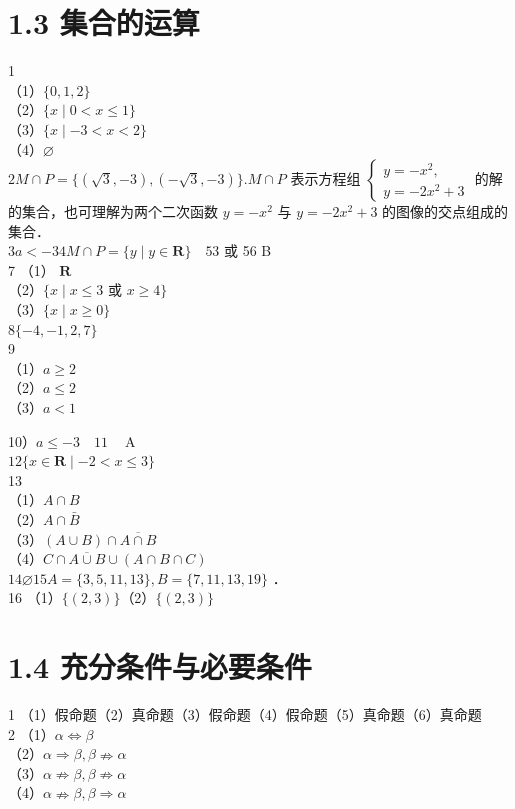 \documentclass[10pt]{article}
\begin{document}
\section*{1.3 集合的运算}
1\\
（1）\(\{0,1,2\}\)\\
（2）\(\{x \mid 0<x \leqslant 1\}\)\\
（3）\(\{x \mid-3<x<2\}\)\\
（4）\(\varnothing\)\\
\(2 M \cap P=\{(\sqrt{3},-3),(-\sqrt{3},-3)\} . M \cap P\) 表示方程组 \(\left\{\begin{array}{l}y=-x^{2}, \\ y=-2 x^{2}+3\end{array}\right.\) 的解的集合，也可理解为两个二次函数 \(y=-x^{2}\) 与 \(y=-2 x^{2}+3\) 的图像的交点组成的集合．\\
\(3 a<-34 M \cap P=\{y \mid y \in \mathbf{R}\} \quad 53\) 或 56 B\\
7 （1） \(\mathbf{R}\)\\
（2）\(\{x \mid x \leqslant 3\) 或 \(x \geqslant 4\}\)\\
（3）\(\{x \mid x \geqslant 0\}\)\\
\(8\{-4,-1,2,7\}\)\\
9\\
（1）\(a \geqslant 2\)\\
（2）\(a \leqslant 2\)\\
（3）\(a<1\)

10）\(a \leqslant-3 \quad 11 \quad \mathrm{~A}\)\\
\(12\{x \in \mathbf{R} \mid-2<x \leqslant 3\}\)\\
13\\
（1）\(A \cap B\)\\
（2）\(A \cap \bar{B}\)\\
（3）\((A \cup B) \cap \overline{A \cap B}\)\\
（4）\(C \cap \overline{A \cup B} \cup(A \cap B \cap C)\)\\
\(14 \varnothing 15 A=\{3,5,11,13\}, B=\{7,11,13,19\}\) ．\\
16 （1）\(\{(2,3)\}\)（2）\(\{(2,3)\}\)

\section*{1.4 充分条件与必要条件}
1 （1）假命题（2）真命题（3）假命题（4）假命题（5）真命题（6）真命题\\
2 （1）\(\alpha \Leftrightarrow \beta\)\\
（2）\(\alpha \Rightarrow \beta, \beta \nRightarrow \alpha\)\\
（3）\(\alpha \nRightarrow \beta, \beta \nRightarrow \alpha\)\\
（4）\(\alpha \nRightarrow \beta, \beta \Rightarrow \alpha\)
\end{document}
